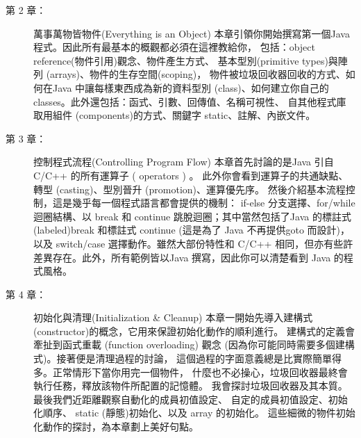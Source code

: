\begin{description}
\item[第 2 章：] 萬事萬物皆物件(Everything is an Object)
本章引領你開始撰寫第一個Java 程式。因此所有最基本的概觀都必須在這裡教給你，
包括：object reference(物件引用)觀念、物件產生方式、
基本型別(primitive types)與陣列 (arrays)、物件的生存空間(scoping)，
物件被垃圾回收器回收的方式、如何在Java 中讓每樣東西成為新的資料型別
(class)、如何建立你自己的classes。此外還包括：函式、引數、回傳值、名稱可視性、
自其他程式庫取用組件 (components)的方式、關鍵字 static、註解、內嵌文件。
\item [第 3 章：] 控制程式流程(Controlling Program Flow)
本章首先討論的是Java 引自C/C++ 的所有運算子 ( operators ) 。
此外你會看到運算子的共通缺點、轉型 (casting)、型別晉升 (promotion)、運算優先序。
然後介紹基本流程控制，這是幾乎每一個程式語言都會提供的機制：
if-else 分支選擇、for/while 迴圈結構、以 break 和 continue
跳脫迴圈；其中當然包括了Java 的標註式(labeled)break 和標註式 continue (這是為了
Java 不再提供goto 而設計)，以及 switch/case 選擇動作。雖然大部份特性和 C/C++
相同，但亦有些許差異存在。此外，所有範例皆以Java 撰寫，因此你可以清楚看到
Java 的程式風格。
\item [第 4 章：] 初始化與清理(Initialization \& Cleanup)
本章一開始先導入建構式(constructor)的概念，它用來保證初始化動作的順利進行。
建構式的定義會牽扯到函式重載 (function overloading) 觀念
(因為你可能同時需要多個建構式)。接著便是清理過程的討論，
這個過程的字面意義總是比實際簡單得多。正常情形下當你用完一個物件，
什麼也不必操心，垃圾回收器最終會執行任務，釋放該物件所配置的記憶體。
我會探討垃圾回收器及其本質。最後我們近距離觀察自動化的成員初值設定、
自定的成員初值設定、初始化順序、 static (靜態)初始化、以及 array 的初始化。
這些細微的物件初始化動作的探討，為本章劃上美好句點。


\end{description}
